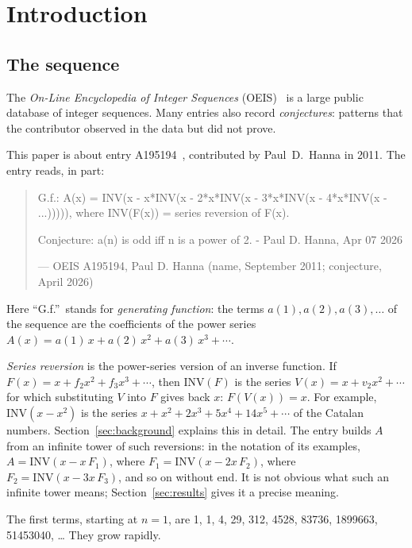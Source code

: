 \documentclass[11pt,a4paper]{article}
\theoremstyle{definition}
\theoremstyle{remark}
\begin{document}
\section{Introduction}

\subsection{The sequence}\label{sec:sequence}
The \emph{On-Line Encyclopedia of Integer Sequences} (OEIS)~\cite{oeisdb} is a large public database of integer
sequences. Many
entries also record \emph{conjectures}: patterns that the contributor observed in the data but did not prove.

This paper is about entry A195194~\cite{oeis}, contributed by Paul~D.~Hanna in 2011. The entry reads, in part:
\begin{quote}\small\ttfamily\raggedright G.f.: A(x) = INV(x - x*INV(x - 2*x*INV(x - 3*x*INV(x - 4*x*INV(x - ...))))), where INV(F(x)) = series reversion of F(x).\par\smallskip Conjecture: a(n) is odd iff n is a power of 2. - Paul D. Hanna, Apr 07 2026\par\smallskip\hfill\textrm{--- OEIS A195194, Paul D. Hanna (name, September 2011; conjecture, April 2026)}\end{quote}

Here ``G.f.''\ stands for \emph{generating function}: the terms $a(1),a(2),a(3),\dots$ of the sequence are the
coefficients of the power series $A(x)=a(1)\,x+a(2)\,x^2+a(3)\,x^3+\cdots$.

\emph{Series reversion} is the power-series version of an inverse function. If $F(x)=x+f_2x^2+f_3x^3+\cdots$, then
$\mathrm{INV}(F)$ is the series $V(x)=x+v_2x^2+\cdots$ for which substituting $V$ into $F$ gives back $x$:
$F(V(x))=x$. For example, $\mathrm{INV}(x-x^2)$ is the series $x+x^2+2x^3+5x^4+14x^5+\cdots$ of the Catalan numbers.
Section~\ref{sec:background} explains this in detail. The entry builds $A$ from an infinite tower of such reversions: in
the notation of its examples, $A=\mathrm{INV}(x-x\,F_1)$, where $F_1=\mathrm{INV}(x-2x\,F_2)$, where
$F_2=\mathrm{INV}(x-3x\,F_3)$, and so on without end. It is not obvious what such an infinite tower means;
Section~\ref{sec:results} gives it a precise meaning.

The first terms, starting at $n=1$, are 1, 1, 4, 29, 312, 4528, 83736, 1899663, 51453040, \dots{} They grow rapidly.
\end{document}
